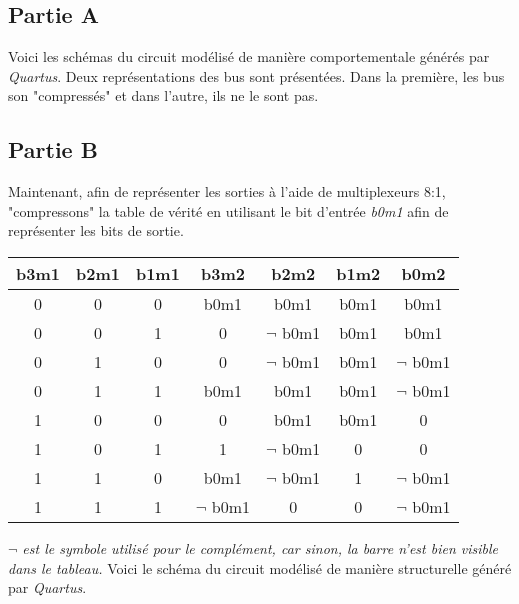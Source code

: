 \documentclass[12pt]{article}
\begin{document}
\pagebreak
\subsection{Partie A}
\vspace*{-12pt}
Voici les schémas du circuit modélisé de manière comportementale générés par \textsl{Quartus}. Deux représentations des bus sont présentées. Dans la première, les bus son "compressés" et dans l'autre, ils ne le sont pas.
\begin{figure}[H]
\end{figure}

\pagebreak
\subsection{Partie B}
Maintenant, afin de représenter les sorties à l'aide de multiplexeurs 8:1, "compressons" la table de vérité en utilisant le bit d'entrée \textsl{b0m1} afin de représenter les bits de sortie.
\singlespacing
\begin{center}
	\begin{tabular}{|c|c|c||c|c|c|c|}
		\hline
		b3m1 & b2m1 & b1m1 & b3m2         & b2m2         & b1m2 & b0m2         \\ \hline
		0    & 0    & 0    & b0m1         & b0m1         & b0m1 & b0m1         \\ \hline
		0    & 0    & 1    & 0            & $\lnot$ b0m1 & b0m1 & b0m1         \\ \hline
		0    & 1    & 0    & 0            & $\lnot$ b0m1 & b0m1 & $\lnot$ b0m1 \\ \hline
		0    & 1    & 1    & b0m1         & b0m1         & b0m1 & $\lnot$ b0m1 \\ \hline
		1    & 0    & 0    & 0            & b0m1         & b0m1 & 0            \\ \hline
		1    & 0    & 1    & 1            & $\lnot$ b0m1 & 0    & 0            \\ \hline
		1    & 1    & 0    & b0m1         & $\lnot$ b0m1 & 1    & $\lnot$ b0m1 \\ \hline
		1    & 1    & 1    & $\lnot$ b0m1 & 0            & 0    & $\lnot$ b0m1 \\ \hline
	\end{tabular}
\end{center}
\small{\textsl{$\lnot$ est le symbole utilisé pour le complément, car sinon, la barre n'est bien visible dans le tableau.}}
\doublespacing
Voici le schéma du circuit modélisé de manière structurelle généré par \textsl{Quartus}.
\end{document}
